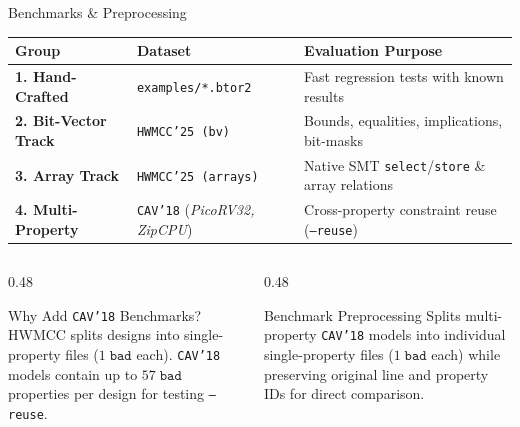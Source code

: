 \documentclass[aspectratio=169,xcolor=dvipsnames]{beamer}
\begin{document}
\begin{frame}{Benchmarks \& Preprocessing}

  \begin{table}
    \centering
    \footnotesize
    \begin{tabular}{lll}
      \toprule
      \textbf{Group} & \textbf{Dataset} & \textbf{Evaluation Purpose} \\
      \midrule
      \textbf{1. Hand-Crafted} & \texttt{examples/*.btor2} & Fast regression tests with known results \\
      \textbf{2. Bit-Vector Track} & \texttt{HWMCC'25 (bv)} & Bounds, equalities, implications, bit-masks \\
      \textbf{3. Array Track} & \texttt{HWMCC'25 (arrays)} & Native SMT \texttt{select}/\texttt{store} \& array relations \\
      \textbf{4. Multi-Property} & \texttt{CAV'18} (\emph{PicoRV32, ZipCPU}) & Cross-property constraint reuse (\texttt{--reuse}) \\
      \bottomrule
    \end{tabular}
  \end{table}

  \vspace{0.25em}

  \begin{columns}[T,onlytextwidth]
    \begin{column}{0.48\textwidth}
      \begin{block}{Why Add \texttt{CAV'18} Benchmarks?}
        HWMCC splits designs into single-property files ($1\;\texttt{bad}$ each). \texttt{CAV'18} models contain up to $57\;\texttt{bad}$ properties per design for testing \texttt{--reuse}.
      \end{block}
    \end{column}

    \begin{column}{0.48\textwidth}
      \begin{exampleblock}{Benchmark Preprocessing}
        Splits multi-property \texttt{CAV'18} models into individual single-property files ($1\;\texttt{bad}$ each) while preserving original line and property IDs for direct comparison.
      \end{exampleblock}
    \end{column}
  \end{columns}

\end{frame}

\end{document}
